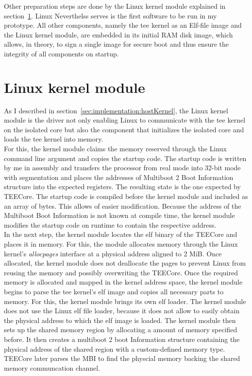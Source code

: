 Other preparation steps are done by the Linux kernel module explained in
section~\ref{sec:implementation:kmod}. Linux Neverthelss serves is the first
software to be run in my prototype. All other components, namely the \gls{tee}
kernel as an Elf-file image and the Linux kernel module, are embedded in its
initial RAM disk image, which allows, in theory, to sign a single image for
secure boot and thus ensure the integrity of all components on startup.\\

\section{Linux kernel module}
\label{sec:implementation:kmod}
As I described in section~\ref{sec:implementation:hostKernel}, the Linux kernel
module is the driver not only enabling Linux to communicate with the \gls{tee}
kernel on the isolated core but also the component that initializes the isolated
core and loads the \gls{tee} kernel into memory.\\

For this, the kernel module claims the memory reserved through the Linux command
line argument and copies the startup code. The startup code is written by me in
assembly and transfers the processor from real mode into 32-bit mode with
segmentation and places the addresses of Multiboot 2 Boot Information structure
into the expected registers. The resulting state is the one expected by TEECore.
The startup code is compiled before the kernel module and included as an array
of bytes. This allows of easier modification. Because the address of the
Multiboot Boot Information is not known at compile time, the kernel module
modifies the startup code on runtime to contain the respective address.\\

In the next step, the kernel module locates the \gls{elf} binary of the TEECore
and places it in memory. For this, the module allocates memory through the Linux
kernel's \textit{allocpages} interface at a physical address aligned to 2 MiB.
Once allocated, the kernel module does not deallocate the pages to prevent Linux
from reusing the memory and possibly overwriting the TEECore. Once the required
memory is allocated and mapped in the kernel address space, the kernel module
begins to parse the \gls{tee} kernel's \gls{elf} image and copies all necessary
parts to memory. For this, the kernel module brings its own \gls{elf} loader.
The kernel module does not use the Linux \gls{elf} file loader, because it does
not allow to easily obtain the physical address to which the \gls{elf} image is
loaded. The kernel module then sets up the shared memory region by allocating a
amount of memory specified before. It then creates a multiboot 2 boot
Information structure containing the physical address of the shared region with
a custom-defined memory type. TEECore later parses the MBI to find the physcial
memory backing the shared memory communcation channel.\\

